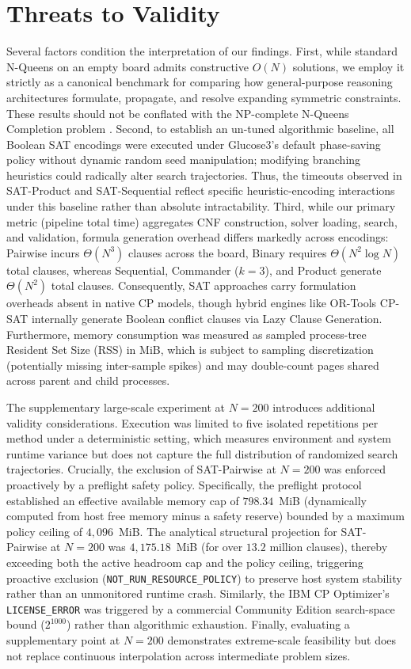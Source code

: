 \section{Threats to Validity}
\label{sec:threats}

Several factors condition the interpretation of our findings. First, while standard N-Queens on an empty board admits constructive $O(N)$ solutions, we employ it strictly as a canonical benchmark for comparing how general-purpose reasoning architectures formulate, propagate, and resolve expanding symmetric constraints. These results should not be conflated with the NP-complete N-Queens Completion problem \citep{gent2017complexity}. Second, to establish an un-tuned algorithmic baseline, all Boolean SAT encodings were executed under Glucose3's default phase-saving policy without dynamic random seed manipulation; modifying branching heuristics could radically alter search trajectories. Thus, the timeouts observed in SAT-Product and SAT-Sequential reflect specific heuristic-encoding interactions under this baseline rather than absolute intractability. Third, while our primary metric (pipeline total time) aggregates CNF construction, solver loading, search, and validation, formula generation overhead differs markedly across encodings: Pairwise incurs $\Theta(N^3)$ clauses across the board, Binary requires $\Theta(N^2 \log N)$ total clauses, whereas Sequential, Commander ($k=3$), and Product generate $\Theta(N^2)$ total clauses. Consequently, SAT approaches carry formulation overheads absent in native CP models, though hybrid engines like OR-Tools CP-SAT internally generate Boolean conflict clauses via Lazy Clause Generation. Furthermore, memory consumption was measured as sampled process-tree Resident Set Size (RSS) in MiB, which is subject to sampling discretization (potentially missing inter-sample spikes) and may double-count pages shared across parent and child processes.

The supplementary large-scale experiment at $N=200$ introduces additional validity considerations. Execution was limited to five isolated repetitions per method under a deterministic setting, which measures environment and system runtime variance but does not capture the full distribution of randomized search trajectories. Crucially, the exclusion of SAT-Pairwise at $N=200$ was enforced proactively by a preflight safety policy. Specifically, the preflight protocol established an effective available memory cap of $798.34$~MiB (dynamically computed from host free memory minus a safety reserve) bounded by a maximum policy ceiling of $4,096$~MiB. The analytical structural projection for SAT-Pairwise at $N=200$ was $4,175.18$~MiB (for over $13.2$ million clauses), thereby exceeding both the active headroom cap and the policy ceiling, triggering proactive exclusion (\texttt{NOT\_RUN\_RESOURCE\_POLICY}) to preserve host system stability rather than an unmonitored runtime crash. Similarly, the IBM CP Optimizer's \texttt{LICENSE\_ERROR} was triggered by a commercial Community Edition search-space bound ($2^{1000}$) rather than algorithmic exhaustion. Finally, evaluating a supplementary point at $N=200$ demonstrates extreme-scale feasibility but does not replace continuous interpolation across intermediate problem sizes.
